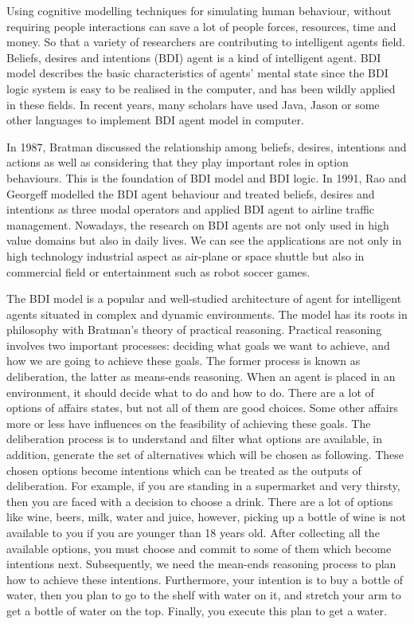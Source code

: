 Using cognitive modelling techniques for simulating human behaviour, without requiring people interactions can save a lot of people forces, resources, time and money. So that a variety of researchers are contributing to intelligent agents field. Beliefs, desires and intentions (BDI) agent is a kind of intelligent agent. BDI model describes the basic characteristics of agents' mental state since the BDI logic system is easy to be realised in the computer, and has been wildly applied in these fields. In recent years, many scholars have used Java, Jason or some other languages to implement BDI agent model in computer.

In 1987, Bratman\cite{MICHAEL_PlansResource_1988} discussed the relationship among beliefs, desires, intentions and actions as well as considering that they play important roles in option behaviours. This is the foundation of BDI model and BDI logic. In 1991, Rao and Georgeff\cite{Michael_BDIAgency_1999} modelled the BDI agent behaviour and treated beliefs, desires and intentions as three modal operators and applied BDI agent to airline traffic management. Nowadays, the research on BDI agents are not only used in high value domains but also in daily lives. We can see the applications are not only in high technology industrial aspect as air-plane or space shuttle but also in commercial field or entertainment such as robot soccer games.

The BDI model is a popular and well-studied architecture of agent for intelligent agents situated in complex and dynamic environments. The model has its roots in philosophy with Bratman’s theory of practical reasoning\cite{Sebastian_Hierarchical_2006}. Practical reasoning involves two important processes: deciding what goals we want to achieve, and how we are going to achieve these goals. The former process is known as deliberation, the latter as means-ends reasoning\cite{Gerhard_MultiSystem_1999}. When an agent is placed in an environment, it should decide what to do and how to do. There are a lot of options of affairs states, but not all of them are good choices. Some other affairs more or less have influences on the feasibility of achieving these goals. The deliberation process is to understand and filter what options are available, in addition, generate the set of alternatives which will be chosen as following. These chosen options become intentions which can be treated as the outputs of deliberation. For example, if you are standing in a supermarket and very thirsty, then you are faced with a decision to choose a drink. There are a lot of options like wine, beers, milk, water and juice, however, picking up a bottle of wine is not available to you if you are younger than 18 years old. After collecting all the available options, you must choose and commit to some of them which become intentions next. Subsequently, we need the mean-ends reasoning process to plan how to achieve these intentions. Furthermore, your intention is to buy a bottle of water, then you plan to go to the shelf with water on it, and stretch your arm to get a bottle of water on the top. Finally, you execute this plan to get a water.

